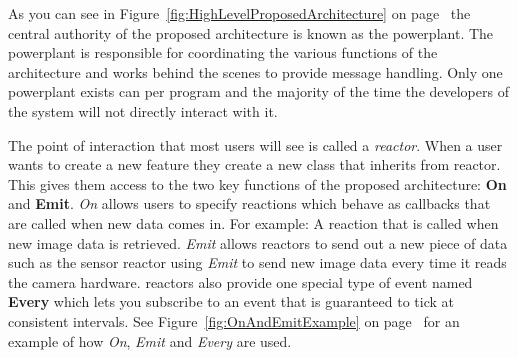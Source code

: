 \documentclass[english,12pt]{scrartcl}
\begin{document}
			As you can see in Figure~\ref{fig:HighLevelProposedArchitecture} on page~\pageref{fig:HighLevelProposedArchitecture} the central authority of the proposed architecture is known as the \gls{powerplant}.
			The \gls{powerplant} is responsible for coordinating the various functions of the architecture and works behind the scenes to provide message handling.
			Only one \gls{powerplant} exists can per program and the majority of the time the developers of the system will not directly interact with it.

			The point of interaction that most users will see is called a \emph{\gls{reactor}}.
			When a user wants to create a new feature they create a new class that inherits from \gls{reactor}.
			This gives them access to the two key functions of the proposed architecture: \textbf{On} and
			\textbf{Emit}.
			\emph{On} allows users to specify reactions which behave as callbacks that are called when new data comes in.
			For example: A reaction that is called when new image data is retrieved. \emph{Emit} allows \glspl{reactor} to send out a new
			piece of data such as the sensor \gls{reactor} using \emph{Emit} to send new image data every
			time it reads the camera hardware. \glspl{reactor} also provide one special type of event named
			\textbf{Every} which lets you subscribe to an event that is guaranteed to tick at
			consistent intervals. See Figure~\ref{fig:OnAndEmitExample} on
			page~\pageref{fig:OnAndEmitExample} for an example of how \emph{On}, \emph{Emit} and
			\emph{Every} are used.
\end{document}
